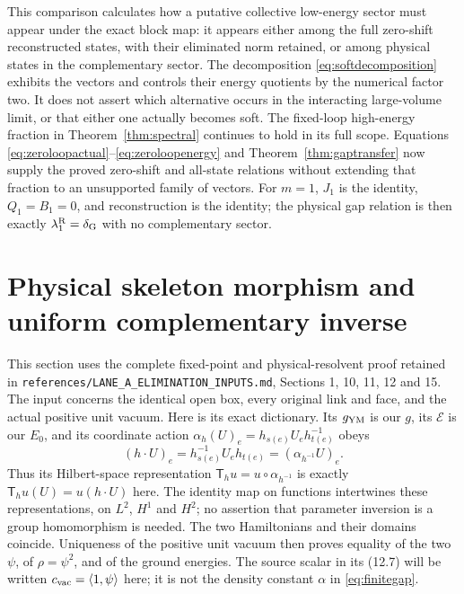 \documentclass[11pt]{article}
\begin{document}
This comparison calculates how a putative collective low-energy sector
must appear under the exact block map: it appears either among the
full zero-shift reconstructed states, with their eliminated norm
retained, or among physical states in the complementary sector.
The decomposition \eqref{eq:softdecomposition} exhibits the vectors
and controls their energy quotients by the numerical factor two.
It does not assert which alternative occurs in the interacting
large-volume limit, or that either one actually becomes soft.
The fixed-loop high-energy fraction in Theorem~\ref{thm:spectral}
continues to hold in its full scope. Equations
\eqref{eq:zeroloopactual}--\eqref{eq:zeroloopenergy} and
Theorem~\ref{thm:gaptransfer} now supply the proved zero-shift and
all-state relations without extending that fraction to an unsupported
family of vectors. For $m=1$, $J_1$ is the identity, $Q_1=B_1=0$,
and reconstruction is the identity; the physical gap relation is then
exactly $\lambda_1^{\rm R}=\delta_{\rm G}$ with no complementary sector.

\section{Physical skeleton morphism and uniform complementary inverse}
\label{sec:uniforminverse}

This section uses the complete fixed-point and physical-resolvent proof
retained in \nolinkurl{references/LANE_A_ELIMINATION_INPUTS.md},
Sections 1, 10, 11, 12 and 15. The input concerns the identical open
box, every original link and face, and the actual positive unit vacuum.
Here is its exact dictionary. Its $g_{\rm YM}$ is our $g$, its
$\mathcal E$ is our $E_0$, and its coordinate action
$\alpha_h(U)_e=h_{s(e)}U_eh_{t(e)}^{-1}$ obeys
\[
 (h\cdot U)_e=h_{s(e)}^{-1}U_eh_{t(e)}
                  =(\alpha_{h^{-1}}U)_e.
\]
Thus its Hilbert-space representation
$\mathsf T_hu=u\circ\alpha_{h^{-1}}$ is exactly
$\mathsf T_hu(U)=u(h\cdot U)$ here. The identity map on functions
intertwines these representations, on $L^2$, $H^1$ and $H^2$;
no assertion that parameter inversion is a group homomorphism is needed.
The two Hamiltonians and their domains coincide. Uniqueness of the
positive unit vacuum then proves equality of the two $\psi$, of
$\rho=\psi^2$, and of the ground energies. The source scalar in its
(12.7) will be written $c_{\rm vac}=\langle1,\psi\rangle$ here;
it is not the density constant $\alpha$ in \eqref{eq:finitegap}.
\end{document}
